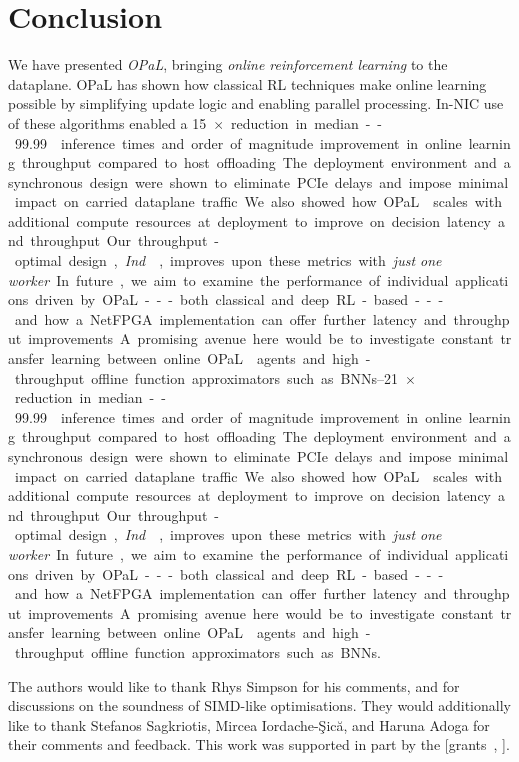 \documentclass[
sigconf,natbib=false
,anonymous=true
,10pt
]{acmart}
\newcommand{\approachshort}{OPaL}
\newcommand{\Indfw}{\emph{Ind}}
\begin{document}
\section{Conclusion}
We have presented \emph{\approachshort{}}, bringing \emph{online reinforcement learning} to the dataplane.
\approachshort{} has shown how classical RL techniques make online learning possible by simplifying update logic and enabling parallel processing.
In-NIC use of these algorithms enabled a \SIrange{15}{21}{$\times$} reduction in median--\num{99.99} inference times and order of magnitude improvement in online learning throughput compared to host offloading.
The deployment environment and asynchronous design were shown to eliminate PCIe delays and impose minimal impact on carried dataplane traffic.
We also showed how \approachshort{} scales with additional compute resources at deployment to improve on decision latency and throughput.
Our throughput-optimal design, \Indfw{}, improves upon these metrics with \emph{just one worker}.

In future, we aim to examine the performance of individual applications driven by \approachshort---both classical and deep RL-based---and how a NetFPGA implementation can offer further latency and throughput improvements.
A promising avenue here would be to investigate constant transfer learning between online \approachshort{} agents and high-throughput offline function approximators such as BNNs.

\begin{acks}
	The authors would like to thank Rhys Simpson for his comments, and for discussions on the soundness of SIMD-like optimisations.
	They would additionally like to thank Stefanos Sagkriotis, Mircea Iordache-\c{S}ic\u{a}, and Haruna Adoga for their comments and feedback.
	This work was supported in part by the  [grants~, ].
\end{acks}
	
%
%
\printbibliography
\end{document}
